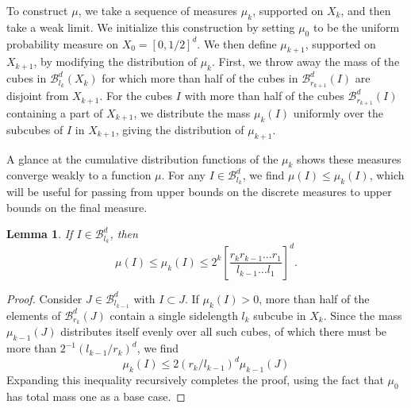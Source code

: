 \documentclass[dvipsnames]{article}
\theoremstyle{plain}
\newtheorem{lemma}{Lemma}
\theoremstyle{plain}
\begin{document}
To construct $\mu$, we take a sequence of measures $\mu_k$, supported on $X_k$, and then take a weak limit. We initialize this construction by setting $\mu_0$ to be the uniform probability measure on $X_0 = [0,1/2]^d$. We then define $\mu_{k+1}$, supported on $X_{k+1}$, by modifying the distribution of $\mu_k$. First, we throw away the mass of the cubes in $\mathcal{B}^d_{l_k}(X_k)$ for which more than half of the cubes in $\mathcal{B}^d_{r_{k+1}}(I)$ are disjoint from $X_{k+1}$. For the cubes $I$ with more than half of the cubes $\mathcal{B}^d_{r_{k+1}}(I)$ containing a part of $X_{k+1}$, we distribute the mass $\mu_k(I)$ uniformly over the subcubes of $I$ in $X_{k+1}$, giving the distribution of $\mu_{k+1}$.

A glance at the cumulative distribution functions of the $\mu_k$ shows these measures converge weakly to a function $\mu$. For any $I \in \mathcal{B}^d_{l_k}$, we find $\mu(I) \leq \mu_k(I)$, which will be useful for passing from upper bounds on the discrete measures to upper bounds on the final measure.

\begin{lemma}
	If $I \in \mathcal{B}^d_{l_k}$, then
	\begin{equation} \label{measurebound}
		\mu(I) \leq \mu_k(I) \leq 2^k \left[ \frac{r_k r_{k-1} \dots r_1}{l_{k-1} \dots l_1} \right]^d.
	\end{equation}
\end{lemma}
\begin{proof}
	Consider $J \in \mathcal{B}^d_{l_{k-1}}$ with $I \subset J$. If $\mu_k(I) > 0$, more than half of the elements of $\mathcal{B}^d_{r_k}(J)$ contain a single sidelength $l_k$ subcube in $X_k$. Since the mass $\mu_{k-1}(J)$ distributes itself evenly over all such cubes, of which there must be more than $2^{-1} (l_{k-1} / r_k)^d$, we find
	\[ \mu_k(I) \leq 2(r_k/l_{k-1})^d \mu_{k-1}(J) \]
	Expanding this inequality recursively completes the proof, using the fact that $\mu_0$ has total mass one as a base case.
\end{proof}
\end{document}
